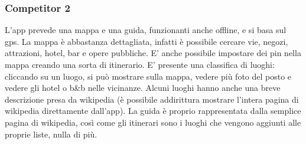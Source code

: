 \subsubsection*{Competitor 2}
L'app prevede una mappa e una guida, funzionanti anche offline, e si basa sul gps.
La mappa è abbastanza dettagliata, infatti è possibile cercare vie,
negozi, attrazioni, hotel, bar e opere pubbliche.
E’ anche possibile impostare dei pin nella mappa creando una sorta di itinerario.
E’ presente una classifica di luoghi: cliccando su un luogo, si può mostrare sulla mappa,
vedere più foto del posto e vedere gli hotel o b&b nelle vicinanze.
Alcuni luoghi hanno anche una breve descrizione presa da wikipedia
(è possibile addirittura mostrare l’intera pagina di wikipedia direttamente dall’app).
La guida è proprio rappresentata dalla semplice pagina di wikipedia, 
così come gli itinerari sono i luoghi che vengono aggiunti alle proprie liste, nulla di più.
